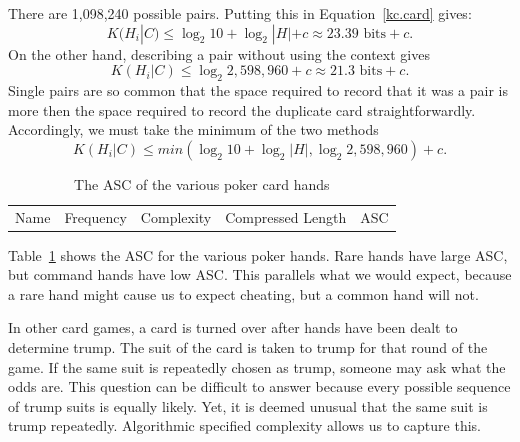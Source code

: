 There are 1,098,240 possible pairs.
Putting this in Equation~\ref{kc.card} gives:
\begin{equation}
    K(H_i|C) \leq \log_2 10 + \log_2 |H| + c \approx 23.39 \mbox{ bits} + c \mbox{.}
\end{equation}
On the other hand, describing a pair without using the context gives
\begin{equation}
    K(H_i|C) \leq \log_2 2,598,960 + c \approx 21.3 \mbox{ bits} + c \mbox{.}
\end{equation}
Single pairs are so common that the space required to record that it was a pair is more then the space required to record the duplicate card straightforwardly. 
Accordingly, we must take the minimum of the two methods
\begin{equation}
    K(H_i|C) \leq min(\log_2 10 + \log_2 |H|, \log_2 2,598,960) + c \mbox{.}
\end{equation}

\begin{table}
    \begin{tabular}{lllll}
        Name & Frequency & Complexity & Compressed Length & ASC \\
        
    \end{tabular}
    \caption{The ASC of the various poker card hands}
    \label{asc.hands}
\end{table}
Table~\ref{asc.hands} shows the ASC for the various poker hands.
Rare hands have large ASC, but command hands have low ASC.
This parallels what we would expect, because a rare hand might cause us to expect cheating, but a common hand will not.

In other card games, a card is turned over after hands have been dealt to determine trump.
The suit of the card is taken to trump for that round of the game.
If the same suit is repeatedly chosen as trump, someone may ask what the odds are.
This question can be difficult to answer because every possible sequence of trump suits is equally likely.
Yet, it is deemed unusual that the same suit is trump repeatedly.
Algorithmic specified complexity allows us to capture this.

